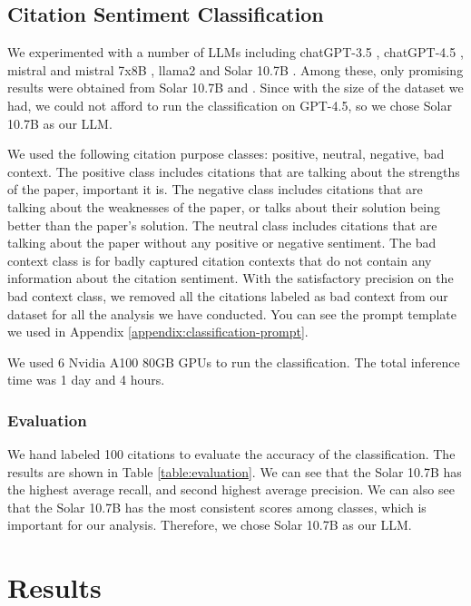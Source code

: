 \documentclass[sigconf]{acmart}
\begin{document}
\subsection{Citation Sentiment Classification}
We experimented with a number of LLMs including chatGPT-3.5 \cite{brown2020language}, chatGPT-4.5 \cite{openai2023gpt4}, mistral and mistral 7x8B \cite{jiang2023mistral}, llama2 \cite{touvron2023llama} and Solar 10.7B \cite{upstage2023solar}. Among these, only promising results were obtained from Solar 10.7B and \cite{openai2023gpt4}. Since with the size of the dataset we had, we could not afford to run the classification on GPT-4.5, so we chose Solar 10.7B as our LLM.

We used the following citation purpose classes: positive, neutral, negative, bad context. The positive class includes citations that are talking about the strengths of the paper, important it is. The negative class includes citations that are talking about the weaknesses of the paper, or talks about their solution being better than the paper's solution. The neutral class includes citations that are talking about the paper without any positive or negative sentiment. The bad context class is for badly captured citation contexts that do not contain any information about the citation sentiment. With the satisfactory precision on the bad context class, we removed all the citations labeled as bad context from our dataset for all the analysis we have conducted. You can see the prompt template we used in Appendix \ref{appendix:classification-prompt}.

We used 6 Nvidia A100 80GB GPUs to run the classification. The total inference time was 1 day and 4 hours.

\subsubsection{Evaluation}
We hand labeled 100 citations to evaluate the accuracy of the classification.
The results are shown in Table \ref{table:evaluation}. We can see that the Solar 10.7B has the highest average recall, and second highest average precision. We can also see that the Solar 10.7B has the most consistent scores among classes, which is important for our analysis. Therefore, we chose Solar 10.7B as our LLM.

\section{Results}
\end{document}
